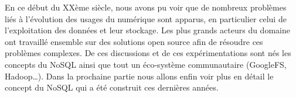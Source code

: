 En ce début du XXème siècle, nous avons pu voir que de nombreux problèmes liés à l'évolution des usages du numérique sont apparus, en particulier celui de l'exploitation des données et leur stockage. Les plus grands acteurs du domaine ont travaillé ensemble sur des solutions open source afin de résoudre ces problèmes complexes. De ces discussions et de ces expérimentations sont nés les concepts du NoSQL ainsi que tout un éco-système communautaire (GoogleFS, Hadoop\dots). Dans la prochaine partie nous allons enfin voir plus en détail le concept du NoSQL qui a été construit ces dernières années.
